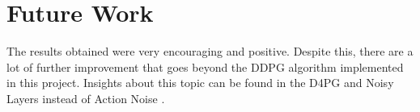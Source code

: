 \documentclass[letterpaper]{article}
\begin{document}
\section{Future Work}

The results obtained were very encouraging and positive. Despite this, there are a lot of further improvement that goes beyond the DDPG algorithm implemented in this project. Insights about this topic can be found in the D4PG \cite{barth2018distributed} and Noisy Layers instead of Action Noise \cite{fortunato2017noisy}.




\end{document}
